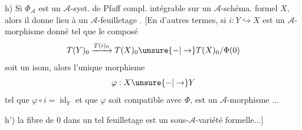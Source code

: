 h) Si $\Phi_{\mathcal A}$ est un $\mathcal A$-syst. de Pfaff compl. intégrable sur un $\mathcal A$-schéma. formel $X$, alors il donne lieu à un $\mathcal A$-feuilletage .
[En d'autres termes, si $i:Y\hookrightarrow X$ est un $\mathcal A$-morphisme donné tel que le composé
\[
T(Y)_0\xrightarrow{T(i)_0}T(X)_0\unsure{-|\to}T(X)_0/\Phi(0)
\]
soit un isom, alors l'unique morphisme
\[
\varphi:X\unsure{-|\to}Y
\]
tel que $\varphi\circ i=\operatorname{id}_Y$ et que $\varphi$ soit compatible avec $\Phi$, est un $\mathcal A$-morphisme $\ldots$

h') la fibre de $0$ dans un tel feuilletage est un sous-$\mathcal A$-variété formelle$\ldots$]

